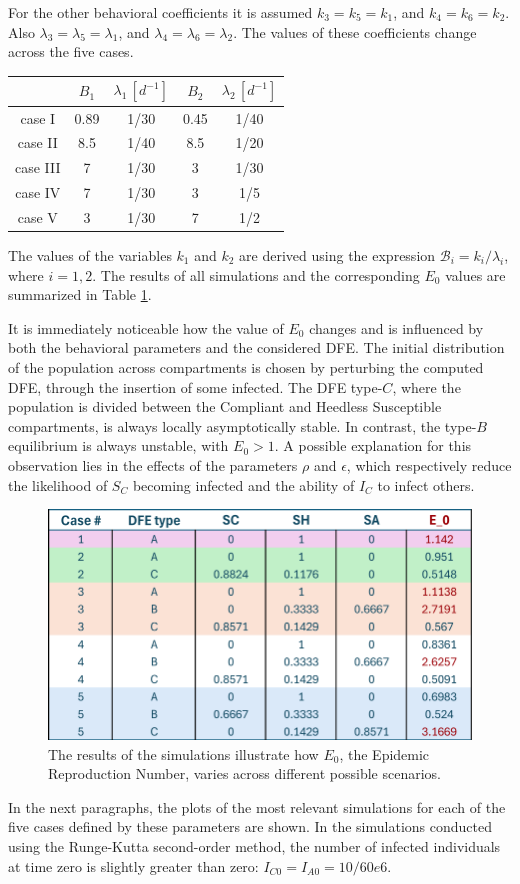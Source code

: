 For the other behavioral coefficients it is assumed $k_3 = k_5 = k_1$, and $k_4 = k_6 = k_2$. Also $\lambda_3 = \lambda_5 = \lambda_1$, and  $\lambda_4 = \lambda_6 = \lambda_2$. 
The values of these coefficients change across the five cases.
\begin{center}
 \begin{tabular}{|c|c|c|c|c|}
 	\hline
 	& $B_1$ & $\lambda_1 \,[d^{-1}]$ & $B_2$ & $\lambda_2 \, [d^{-1}]$ \\
 	\hline
 	case I & 0.89 & 1/30 & 0.45 & 1/40 \\
 	\hline
 	case II & 8.5 & 1/40 & 8.5 & 1/20 \\
 	\hline
 	case III & 7 & 1/30 & 3 & 1/30 \\
 	\hline
 	case IV & 7 & 1/30 & 3 & 1/5 \\
 	\hline
 	case V & 3 & 1/30 & 7 & 1/2 \\
 	\hline
 \end{tabular}
\end{center}
The values of the variables $k_1$ and $k_2$ are derived using the expression $\mathcal{B}_i = k_i/\lambda_i$, where $i = 1, 2$.
The results of all simulations and the corresponding $E_0$ values are summarized in Table \ref{fig:valori-dfe-e-e0caso3}.

It is immediately noticeable how the value of $E_0$ changes and is influenced by both the behavioral parameters and the considered DFE.  The initial distribution of the population across compartments is chosen by perturbing the computed DFE, through the insertion of some infected. The DFE type-$C$, where the population is divided between the Compliant and Heedless Susceptible compartments, is always locally asymptotically stable. In contrast, the type-$B$ equilibrium is always unstable, with $E_0>1$. A possible explanation for this observation lies in the effects of the parameters $\rho$ and $\epsilon$, which respectively reduce the likelihood of $S_C$ becoming infected and the ability of $I_C$ to infect others.
\begin{figure}[h]
	\centering
	\includegraphics[width=0.6\linewidth]{"1_corpo/figure/Valori DFE e E_0_caso_3"}
	\caption[$E_0$ simulation results]{The results of the simulations illustrate how $E_0$, the Epidemic Reproduction Number, varies across different possible scenarios.}
	\label{fig:valori-dfe-e-e0caso3}
\end{figure}
In the next paragraphs, the plots of the most relevant simulations for each of the five cases defined by these parameters are shown. In the simulations conducted using the Runge-Kutta second-order method, the number of infected individuals at time zero is slightly greater than zero: $I_{C0}= I_{A0} = 10/60e6$.


